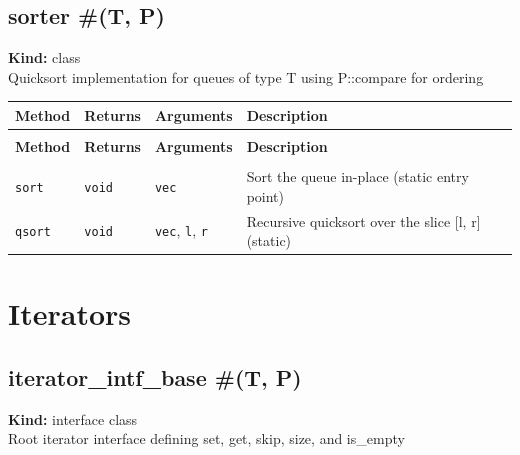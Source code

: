 \documentclass[11pt,letterpaper]{report}
\begin{document}
\section{sorter \#(T, P)}
\label{cls:sorterTP}

\noindent\textbf{Kind:} class\\
\noindent Quicksort implementation for queues of type T using P::compare for ordering

\begin{xltabular}{\linewidth}{>{\small}p{1.35in} >{\small}p{1.25in} >{\small}p{0.95in} >{\small}X}
\toprule
\textbf{Method} & \textbf{Returns} & \textbf{Arguments} & \textbf{Description} \\
\midrule
\endfirsthead
{} \\
\midrule
\textbf{Method} & \textbf{Returns} & \textbf{Arguments} & \textbf{Description} \\
\midrule
\endhead
\midrule
{} \\
\endfoot
\bottomrule
\endlastfoot
\texttt{sort} & \texttt{void} & \texttt{vec} & Sort the queue in-place (static entry point) \\
\texttt{qsort} & \texttt{void} & \texttt{vec}, \texttt{l}, \texttt{r} & Recursive quicksort over the slice [l, r] (static) \\
\end{xltabular}

\chapter{Iterators}

\section{iterator\_intf\_base \#(T, P)}
\label{cls:iteratorintfbaseTP}

\noindent\textbf{Kind:} interface class\\
\noindent Root iterator interface defining set, get, skip, size, and is\_empty
\end{document}
